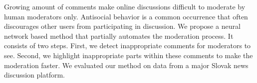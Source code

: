 Growing amount of comments make online discussions difficult to moderate by human moderators only. Antisocial behavior is a common occurrence that often discourages other users from participating in discussion. We propose a neural network based method that partially automates the moderation process. It consists of two steps. First, we detect inappropriate comments for moderators to see. Second, we highlight inappropriate parts within these comments to make the moderation faster. We evaluated our method on data from a major Slovak news discussion platform.
